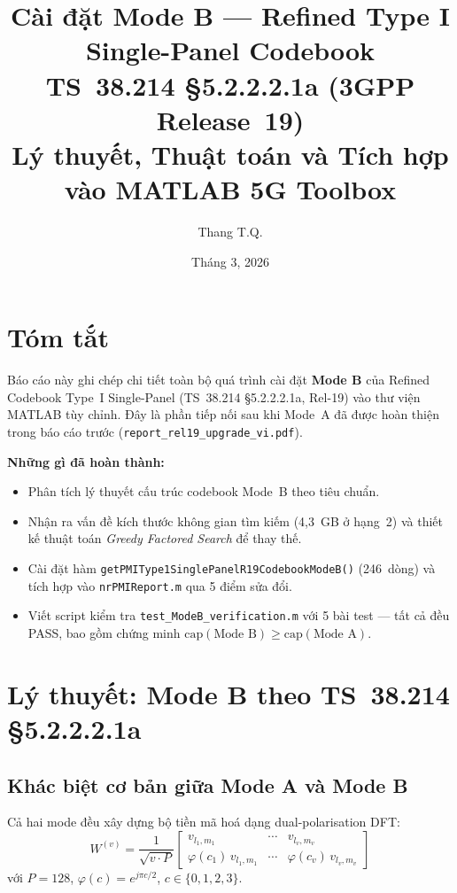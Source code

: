 \documentclass[11pt,a4paper]{article}
\title{
  \Large\textbf{Cài đặt Mode B --- Refined Type I Single-Panel Codebook}\\[0.4em]
  \large TS~38.214 \S5.2.2.2.1a (3GPP Release~19)\\[0.4em]
  \normalsize Lý thuyết, Thuật toán và Tích hợp vào MATLAB 5G Toolbox
}
\author{Thang T.Q.}
\date{Tháng 3, 2026}
\begin{document}
\maketitle
\tableofcontents
\newpage

\section{Tóm tắt}

Báo cáo này ghi chép chi tiết toàn bộ quá trình cài đặt \textbf{Mode B} của
Refined Codebook Type~I Single-Panel (TS~38.214 \S5.2.2.2.1a, Rel-19)
vào thư viện MATLAB tùy chỉnh.
Đây là phần tiếp nối sau khi Mode~A đã được hoàn thiện trong báo cáo trước
(\texttt{report\_rel19\_upgrade\_vi.pdf}).

\medskip
\noindent\textbf{Những gì đã hoàn thành:}
\begin{itemize}
  \item Phân tích lý thuyết cấu trúc codebook Mode~B theo tiêu chuẩn.
  \item Nhận ra vấn đề kích thước không gian tìm kiếm (4,3~GB ở hạng~2) và
        thiết kế thuật toán \emph{Greedy Factored Search} để thay thế.
  \item Cài đặt hàm \texttt{getPMIType1SinglePanelR19CodebookModeB()}
        (246~dòng) và tích hợp vào \texttt{nrPMIReport.m} qua 5 điểm sửa đổi.
  \item Viết script kiểm tra \texttt{test\_ModeB\_verification.m} với 5 bài test
        --- tất cả đều PASS, bao gồm chứng minh
        $\text{cap}(\text{Mode~B}) \geq \text{cap}(\text{Mode~A})$.
\end{itemize}

\section{Lý thuyết: Mode B theo TS~38.214 \S5.2.2.2.1a}

\subsection{Khác biệt cơ bản giữa Mode A và Mode B}

Cả hai mode đều xây dựng bộ tiền mã hoá dạng dual-polarisation DFT:
\begin{equation}
  W^{(v)} = \frac{1}{\sqrt{v \cdot P}}
  \begin{bmatrix}
    v_{l_1,m_1} & \cdots & v_{l_v,m_v} \\
    \varphi(c_1)\,v_{l_1,m_1} & \cdots & \varphi(c_v)\,v_{l_v,m_v}
  \end{bmatrix}
  \label{eq:precoder}
\end{equation}
với $P = 128$, $\varphi(c) = e^{j\pi c/2}$, $c \in \{0,1,2,3\}$.
\end{document}
